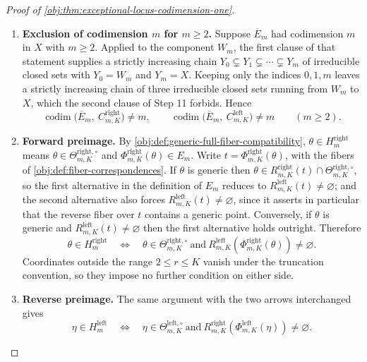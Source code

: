 \begin{proof}[Proof of \cref{obj:thm:exceptional-locus-codimension-one}]
\begin{enumerate}
\item \textbf{Exclusion of codimension \(m\) for \(m\ge2\).}  Suppose \(\overline E_m\) had codimension \(m\) in \(X\) with \(m\ge2\).  Applied to the component \(W_m\), the first clause of that statement supplies a strictly increasing chain \(Y_0\subsetneq Y_1\subsetneq\cdots\subsetneq Y_m\) of irreducible closed sets with \(Y_0=W_m\) and \(Y_m=X\).  Keeping only the indices \(0,1,m\) leaves a strictly increasing chain of three irreducible closed sets running from \(W_m\) to \(X\), which the second clause of Step 11 forbids.  Hence
\[
\operatorname{codim}\bigl(\overline E_m,\ C^{\mathrm{right}}_{m,K}\bigr)\ne m,
\qquad
\operatorname{codim}\bigl(\overline E_m,\ C^{\mathrm{left}}_{m,K}\bigr)\ne m
\qquad (m\ge2).
\]

\item \textbf{Forward preimage.}  By \cref{obj:def:generic-full-fiber-compatibility}, \(\theta\in H^{\mathrm{right}}_m\) means \(\theta\in\Theta^{\mathrm{right},\circ}_{m,K}\) and \(\Phi^{\mathrm{right}}_{m,K}(\theta)\in E_m\).  Write \(t=\Phi^{\mathrm{right}}_{m,K}(\theta)\), with the fibers of \cref{obj:def:fiber-correspondences}.  If \(\theta\) is generic then \(\theta\in R^{\mathrm{right}}_{m,K}(t)\cap\Theta^{\mathrm{right},\circ}_{m,K}\), so the first alternative in the definition of \(E_m\) reduces to \(R^{\mathrm{left}}_{m,K}(t)\ne\varnothing\); and the second alternative also forces \(R^{\mathrm{left}}_{m,K}(t)\ne\varnothing\), since it asserts in particular that the reverse fiber over \(t\) contains a generic point.  Conversely, if \(\theta\) is generic and \(R^{\mathrm{left}}_{m,K}(t)\ne\varnothing\) then the first alternative holds outright.  Therefore
\[
\theta\in H^{\mathrm{right}}_m
\quad\Longleftrightarrow\quad
\theta\in\Theta^{\mathrm{right},\circ}_{m,K}
\ \text{and}\
R^{\mathrm{left}}_{m,K}\!\left(\Phi^{\mathrm{right}}_{m,K}(\theta)\right)\neq\varnothing .
\]
Coordinates outside the range \(2\le r\le K\) vanish under the truncation convention, so they impose no further condition on either side.

\item \textbf{Reverse preimage.}  The same argument with the two arrows interchanged gives
\[
\eta\in H^{\mathrm{left}}_m
\quad\Longleftrightarrow\quad
\eta\in\Theta^{\mathrm{left},\circ}_{m,K}
\ \text{and}\
R^{\mathrm{right}}_{m,K}\!\left(\Phi^{\mathrm{left}}_{m,K}(\eta)\right)\neq\varnothing .
\]


\end{enumerate}
\end{proof}
